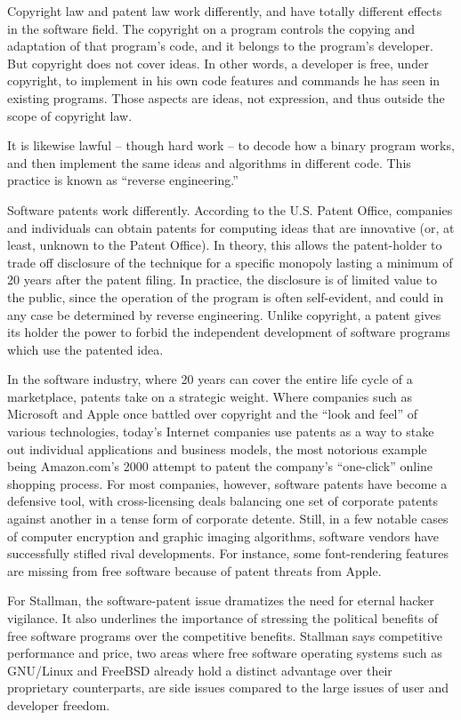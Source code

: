 Copyright law and patent law work differently, and have totally different effects in the software field.  The copyright on a program controls the copying and adaptation of that program's code, and it belongs to the program's developer.  But copyright does not cover ideas. In other words, a developer is free, under copyright, to implement in his own code features and commands he has seen in existing programs.  Those aspects are ideas, not expression, and thus outside the scope of copyright law.

It is likewise lawful -- though hard work -- to decode how a binary program works, and then implement the same ideas and algorithms in different code.  This practice is known as ``reverse engineering.''

Software patents work differently. According to the U.S. Patent Office, companies and individuals can obtain patents for computing ideas that are innovative (or, at least, unknown to the Patent Office). In theory, this allows the patent-holder to trade off disclosure of the technique for a specific monopoly lasting a minimum of 20 years after the patent filing. In practice, the disclosure is of limited value to the public, since the operation of the program is often self-evident, and could in any case be determined by reverse engineering. Unlike copyright, a patent gives its holder the power to forbid the independent development of software programs which use the patented idea.

In the software industry, where 20 years can cover the entire life cycle of a marketplace, patents take on a strategic weight. Where companies such as Microsoft and Apple once battled over copyright and the ``look and feel'' of various technologies, today's Internet companies use patents as a way to stake out individual applications and business models, the most notorious example being Amazon.com's 2000 attempt to patent the company's ``one-click'' online shopping process. For most companies, however, software patents have become a defensive tool, with cross-licensing deals balancing one set of corporate patents against another in a tense form of corporate detente. Still, in a few notable cases of computer encryption and graphic imaging algorithms, software vendors have successfully stifled rival developments.  For instance, some font-rendering features are missing from free software because of patent threats from Apple.

For Stallman, the software-patent issue dramatizes the need for eternal hacker vigilance. It also underlines the importance of stressing the political benefits of free software programs over the competitive benefits. Stallman says competitive performance and price, two areas where free software operating systems such as GNU/Linux and FreeBSD already hold a distinct advantage over their proprietary counterparts, are side issues compared to the large issues of user and developer freedom.

